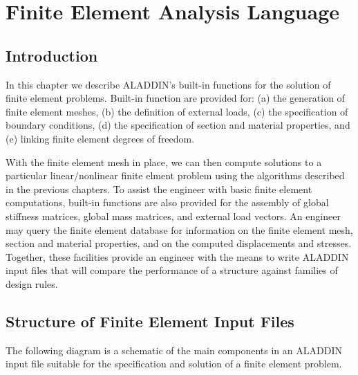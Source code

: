\chapter {Finite Element Analysis Language}

\section{Introduction}

\vspace{0.15 in}
\noindent\hspace{0.5 in}
In this chapter we describe ALADDIN's built-in functions for
the solution of finite element problems.
Built-in function are provided for:
(a) the generation of finite element meshes,
(b) the definition of external loads,
(c) the specification of boundary conditions,
(d) the specification of section and material properties,
and (e) linking finite element degrees of freedom.

\vspace{0.15 in}
\noindent\hspace{0.5 in}
With the finite element mesh in place, we can then compute
solutions to a particular linear/nonlinear finite elment problem
using the algorithms described in the previous chapters.
To assist the engineer with basic finite element computations,
built-in functions are also provided for the assembly of
global stiffness matrices, global mass matrices, and external load vectors.
An engineer may query the finite element database
for information on the finite element mesh,
section and material properties,
and on the computed displacements and stresses.
Together, these facilities provide an engineer with the means to
write ALADDIN input files that will compare the performance
of a structure against families of design rules.

\section{Structure of Finite Element Input Files}
\label{section-structure-of-input-files}

\vspace{0.15 in}
\noindent\hspace{0.5 in}
The following diagram is a schematic of the main
components in an ALADDIN input file suitable
for the specification and solution of a finite element problem.

